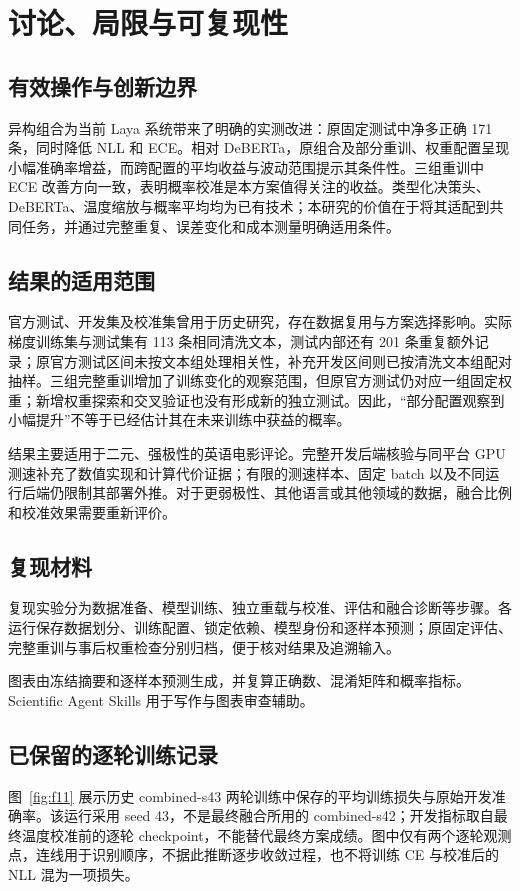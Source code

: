 \documentclass[UTF8,fontset=fandol,a4paper,11pt]{ctexart}
\begin{document}
\section{讨论、局限与可复现性}
\subsection{有效操作与创新边界}
异构组合为当前 Laya 系统带来了明确的实测改进：原固定测试中净多正确 171 条，同时降低 NLL 和 ECE。相对 DeBERTa，原组合及部分重训、权重配置呈现小幅准确率增益，而跨配置的平均收益与波动范围提示其条件性。三组重训中 ECE 改善方向一致，表明概率校准是本方案值得关注的收益。类型化决策头、DeBERTa、温度缩放与概率平均均为已有技术；本研究的价值在于将其适配到共同任务，并通过完整重复、误差变化和成本测量明确适用条件。

\subsection{结果的适用范围}
官方测试、开发集及校准集曾用于历史研究，存在数据复用与方案选择影响。实际梯度训练集与测试集有 113 条相同清洗文本，测试内部还有 201 条重复额外记录；原官方测试区间未按文本组处理相关性，补充开发区间则已按清洗文本组配对抽样。三组完整重训增加了训练变化的观察范围，但原官方测试仍对应一组固定权重；新增权重探索和交叉验证也没有形成新的独立测试。因此，“部分配置观察到小幅提升”不等于已经估计其在未来训练中获益的概率。

结果主要适用于二元、强极性的英语电影评论。完整开发后端核验与同平台 GPU 测速补充了数值实现和计算代价证据；有限的测速样本、固定 batch 以及不同运行后端仍限制其部署外推。对于更弱极性、其他语言或其他领域的数据，融合比例和校准效果需要重新评价。

\subsection{复现材料}
复现实验分为数据准备、模型训练、独立重载与校准、评估和融合诊断等步骤。各运行保存数据划分、训练配置、锁定依赖、模型身份和逐样本预测；原固定评估、完整重训与事后权重检查分别归档，便于核对结果及追溯输入。

图表由冻结摘要和逐样本预测生成，并复算正确数、混淆矩阵和概率指标。Scientific Agent Skills 用于写作与图表审查辅助\cite{skills}。

\subsection{已保留的逐轮训练记录}
图~\ref{fig:f11} 展示历史 combined-s43 两轮训练中保存的平均训练损失与原始开发准确率。该运行采用 seed 43，不是最终融合所用的 combined-s42；开发指标取自最终温度校准前的逐轮 checkpoint，不能替代最终方案成绩。图中仅有两个逐轮观测点，连线用于识别顺序，不据此推断逐步收敛过程，也不将训练 CE 与校准后的 NLL 混为一项损失。
\end{document}
